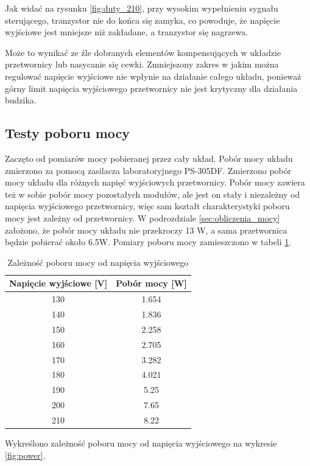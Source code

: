 \documentclass[../main.tex]{subfiles}
\begin{document}
Jak widać na rysunku \ref{fig:duty_210}, przy wysokim wypełnieniu sygnału sterującego,
tranzystor nie do końca się zamyka, co powoduje, że napięcie wyjściowe jest mniejsze niż zakładane, 
a tranzystor się nagrzewa.

Może to wynikać ze źle dobranych elementów kompensujących w układzie przetwornicy lub nasycanie się cewki.
Zmniejszony zakres w jakim można regulować napięcie wyjściowe nie wpłynie na działanie całego układu,
ponieważ górny limit napięcia wyjściowego przetwornicy nie jest krytyczny dla działania budzika.

\subsection{Testy poboru mocy}
Zaczęto od pomiarów mocy pobieranej przez cały układ. Pobór mocy układu zmierzono za pomocą zasilacza laboratoryjnego PS-305DF.
Zmierzono pobór mocy układu dla różnych napięć wyjściowych przetwornicy. Pobór mocy zawiera też w sobie pobór mocy pozostałych modułów,
ale jest on stały i niezależny od napięcia wyjściowego przetwornicy, więc sam kształt charakterystyki poboru mocy jest zależny od przetwornicy.
W podrozdziale \ref{sec:obliczenia_mocy} założono, że pobór mocy układu nie przekroczy 13 W, a sama przetwornica będzie pobierać około 6.5W.
Pomiary poboru mocy zamieszczono w tabeli \ref{tab:power}.

\begin{table}[H]
    \centering
    \begin{tabular}{|c|c|}
        \hline
        Napięcie wyjściowe [V] & Pobór mocy [W] \\
        \hline
        130 & 1.654 \\
        140 & 1.836 \\
        150 & 2.258 \\
        160 & 2.705 \\
        170 & 3.282 \\
        180 & 4.021 \\
        190 & 5.25 \\
        200 & 7.65 \\
        210 & 8.22 \\
        \hline
    \end{tabular}
    \caption{Zależność poboru mocy od napięcia wyjściowego}
    \label{tab:power}
\end{table}

Wykreślono zależność poboru mocy od napięcia wyjściowego na wykresie \ref{fig:power}.
\end{document}
